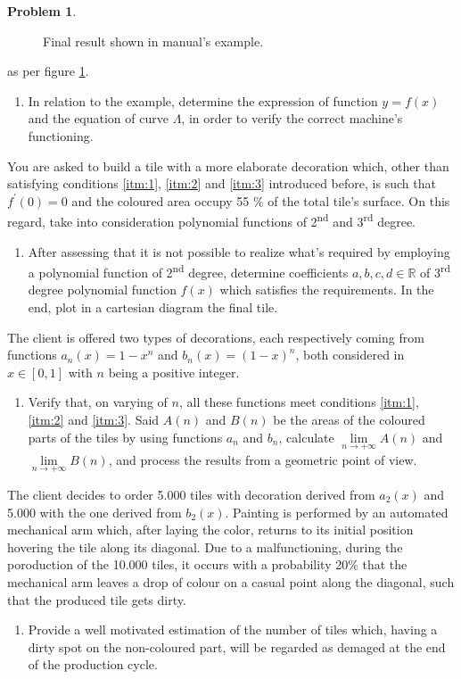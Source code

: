 \documentclass[a4paper,12pt,reqno]{amsart}
\theoremstyle{definition}
\newtheorem{problem}{Problem}
\begin{document}
\begin{problem}
\begin{figure}
   \caption{Final result shown in manual's example.}
   \label{fig:pattern}
   \end{figure}
%
as per figure \ref{fig:pattern}.
\begin{enumerate}
\item In relation to the example, determine the expression of function $y=f(x)$ and the equation of curve
$\Lambda$, in order to verify the correct machine's functioning.
\end{enumerate}
You are asked to build a tile with a more elaborate decoration which, other than satisfying conditions \ref{itm:1},
\ref{itm:2} and \ref{itm:3} introduced before, is such that $f^\prime(0) = 0$ and the coloured area occupy
55 \% of the total tile's surface. On this regard, take into consideration polynomial functions of 2\textsuperscript{nd}
and 3\textsuperscript{rd} degree.
\begin{enumerate}[resume]
\item After assessing that it is not possible to realize what's required by employing a polynomial function of
2\textsuperscript{nd} degree, determine coefficients $a,b,c,d \in \mathbb{R}$ of 
3\textsuperscript{rd} degree polynomial function $f(x)$ which satisfies the requirements. In the end, plot in
a cartesian diagram the final tile.
\end{enumerate}
The client is offered two types of decorations, each respectively coming from functions $a_n(x)=1-x^n$
and $b_n(x)=(1-x)^n$, both considered in $x\in[0,1]$ with $n$ being a positive integer.
\begin{enumerate}[resume]
\item Verify that, on varying of $n$, all these functions meet conditions \ref{itm:1},
\ref{itm:2} and \ref{itm:3}. Said $A(n)$ and $B(n)$ be the areas of the coloured parts of the tiles by
using functions $a_n$ and $b_n$, calculate $\lim\limits_{n \to +\infty} A(n)$ and 
$\lim\limits_{n \to +\infty} B(n)$, and
process the results from a geometric point of view.
\end{enumerate}
The client decides to order 5.000 tiles with decoration derived from $a_2(x)$ and 5.000 with the one derived from
$b_2(x)$. Painting is performed by an automated mechanical arm which, after laying the color, returns to its
initial position hovering the tile along its diagonal. Due to a malfunctioning, during the poroduction of the 10.000
tiles, it occurs with a probability 20\% that the mechanical arm leaves a drop of colour on a casual point 
along the diagonal, such that the produced tile gets dirty.
\begin{enumerate}[resume]
\item Provide a well motivated estimation of the number of tiles which, having a dirty spot on the non-coloured
part, will be regarded as demaged at the end of the production cycle.
\end{enumerate}
\end{problem}
\end{document}
